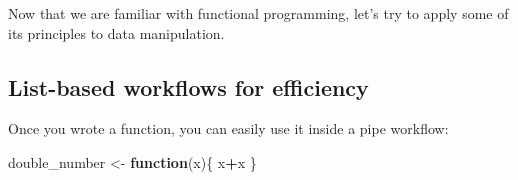 \documentclass[]{gitbook}
\newenvironment{Shaded}{\begin{snugshade}}{\end{snugshade}}
\newcommand{\ControlFlowTok}[1]{\textcolor[rgb]{0.13,0.29,0.53}{\textbf{#1}}}
\newcommand{\DataTypeTok}[1]{\textcolor[rgb]{0.13,0.29,0.53}{#1}}
\newcommand{\KeywordTok}[1]{\textcolor[rgb]{0.13,0.29,0.53}{\textbf{#1}}}
\newcommand{\NormalTok}[1]{#1}
\newcommand{\OperatorTok}[1]{\textcolor[rgb]{0.81,0.36,0.00}{\textbf{#1}}}
\newcommand{\StringTok}[1]{\textcolor[rgb]{0.31,0.60,0.02}{#1}}
\begin{document}
Now that we are familiar with functional programming, let's try to apply some of its principles
to data manipulation.

\hypertarget{list-based-workflows-for-efficiency}{%
\subsection{List-based workflows for efficiency}\label{list-based-workflows-for-efficiency}}

Once you wrote a function, you can easily use it inside a pipe workflow:

\begin{Shaded}
\begin{Highlighting}[]
\NormalTok{double_number <-}\StringTok{ }\ControlFlowTok{function}\NormalTok{(x)\{}
\NormalTok{  x}\OperatorTok{+}\NormalTok{x}
\NormalTok{\}}
\end{Highlighting}
\end{Shaded}

\begin{Shaded}
\end{Shaded}
\end{document}
